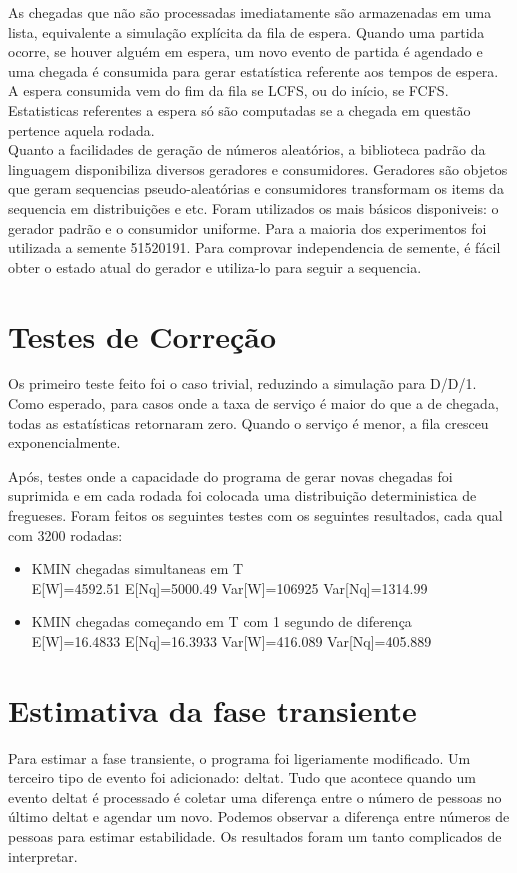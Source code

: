 \documentclass{article}
\begin{document}
As chegadas que não são processadas imediatamente são armazenadas em uma lista, equivalente a simulação explícita da fila de espera. Quando uma partida ocorre, se houver alguém em espera, um novo evento de partida é agendado e uma chegada é consumida para gerar estatística referente aos tempos de espera. A espera consumida vem do fim da fila se LCFS, ou do início, se FCFS. Estatisticas referentes a espera só são computadas se a chegada em questão pertence aquela rodada. \\

Quanto a facilidades de geração de números aleatórios, a biblioteca padrão da linguagem disponibiliza diversos geradores e consumidores. Geradores são objetos que geram sequencias pseudo-aleatórias e consumidores transformam os items da sequencia em distribuições e etc. Foram utilizados os mais básicos disponiveis: o gerador padrão e o consumidor uniforme. Para a maioria dos experimentos foi utilizada a semente 51520191. Para comprovar independencia de semente, é fácil obter o estado atual do gerador e utiliza-lo para seguir a sequencia.

\section{Testes de Correção}
Os primeiro teste feito foi o caso trivial, reduzindo a simulação para D/D/1. Como esperado, para casos onde a taxa de serviço é maior do que a de chegada, todas as estatísticas retornaram zero. Quando o serviço é menor, a fila cresceu exponencialmente.

Após, testes onde a capacidade do programa de gerar novas chegadas foi suprimida e em cada rodada foi colocada uma distribuição deterministica de fregueses. Foram feitos os seguintes testes com os seguintes resultados, cada qual com 3200 rodadas:

\begin{itemize}
\item KMIN chegadas simultaneas em T \\
E[W]=4592.51 E[Nq]=5000.49 Var[W]=106925 Var[Nq]=1314.99 
\item KMIN chegadas começando em T com 1 segundo de diferença \\
E[W]=16.4833 E[Nq]=16.3933 Var[W]=416.089 Var[Nq]=405.889 
\end{itemize}



\section{Estimativa da fase transiente}
Para estimar a fase transiente, o programa foi ligeriamente modificado. Um terceiro tipo de evento foi adicionado: deltat. Tudo que acontece quando um evento deltat é processado é coletar uma diferença entre o número de pessoas no último deltat e  agendar um novo. Podemos observar a diferença entre números de pessoas para estimar estabilidade. Os resultados foram um tanto complicados de interpretar.
\end{document}

